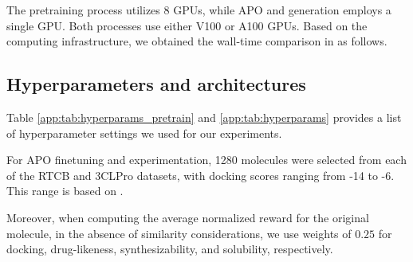 {The pretraining process utilizes 8 GPUs, while APO and generation employs a single GPU. Both processes use either V100 or A100 GPUs. Based on the computing infrastructure, we obtained the wall-time comparison in  as follows.}

 \begin{table*}[ht!]
 {
    \centering
    {\scriptsize
    }
    \caption{{Wall-time comparison between different methods.} }
        \label{table:wall-time}   
        }
\end{table*}


\subsection{{Hyperparameters and architectures}}\label{app:hyperparameters}
Table \ref{app:tab:hyperparams_pretrain} and  \ref{app:tab:hyperparams} provides a list of hyperparameter settings we used for our experiments.

For APO finetuning and experimentation, 1280 molecules were selected from each of the RTCB and 3CLPro datasets, with docking scores ranging from -14 to -6. This range is based on \citep{liu2024erp}.

{Moreover, when computing the average normalized reward for the original molecule, in the absence of similarity considerations, we use weights of $0.25$ for docking, drug-likeness, synthesizability, and solubility, respectively.
}

